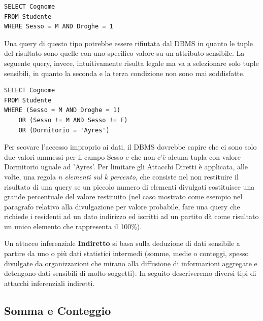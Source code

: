 \begin{algorithm}
\begin{lstlisting}[caption={Query che sfrutta inferenza per ottenere dati sensibili e viene bloccata}]
SELECT Cognome
FROM Studente
WHERE Sesso = M AND Droghe = 1
\end{lstlisting}
\end{algorithm}

Una query di questo tipo potrebbe essere rifiutata dal DBMS in quanto le tuple del risultato sono quelle con uno specifico valore su un attributo sensibile. La seguente query, invece, intuitivamente risulta legale ma va a selezionare solo tuple sensibili, in quanto la seconda e la terza condizione non sono mai soddisfatte.

\begin{algorithm}
\begin{lstlisting}[caption={Query che sfrutta inferenza per ottenere dati sensibili e non viene bloccata}]
SELECT Cognome
FROM Studente
WHERE (Sesso = M AND Droghe = 1)
	OR (Sesso != M AND Sesso != F)
	OR (Dormitorio = 'Ayres')
\end{lstlisting}
\end{algorithm}

Per scovare l'accesso improprio ai dati, il DBMS dovrebbe capire che ci sono solo due valori ammessi per il campo Sesso e che non c'è alcuna tupla con valore Dormitorio uguale ad 'Ayres'. Per limitare gli Attacchi Diretti è applicata, alle volte, una regola \textit{n elementi sul k percento}, che consiste nel non restituire il risultato di una query se un piccolo numero di elementi divulgati costituisce una grande percentuale del valore restituito (nel caso mostrato come esempio nel paragrafo relativo alla divulgazione per valore probabile, fare una query che richiede i residenti ad un dato indirizzo ed iscritti ad un partito dà come risultato un unico elemento che rappresenta il 100\%).

Un attacco inferenziale \textbf{Indiretto} si basa sulla deduzione di dati sensibile a partire da uno o più dati statistici intermedi (somme, medie o conteggi, spesso divulgate da organizzazioni che mirano alla diffusione di informazioni aggregate e detengono dati sensibili di molto soggetti). In seguito descriveremo diversi tipi di attacchi inferenziali indiretti.

\subsection{Somma e Conteggio}

